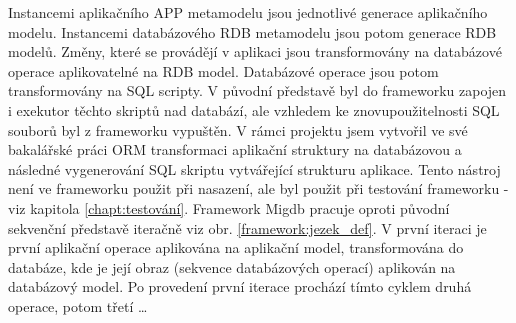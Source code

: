 \documentclass[11pt,twoside,a4paper]{book}
\begin{document}
%
Instancemi aplikačního APP metamodelu jsou jednotlivé generace aplikačního
modelu. Instancemi databázového RDB metamodelu jsou potom generace RDB modelů.
Změny, které se provádějí v aplikaci jsou transformovány na databázové operace
aplikovatelné na RDB model. Databázové operace jsou potom transformovány na SQL
scripty. V původní představě byl do frameworku zapojen i exekutor těchto
skriptů nad databází, ale vzhledem ke znovupoužitelnosti SQL souborů byl z
frameworku vypuštěn.
\FloatBarrier
%
V rámci projektu jsem vytvořil ve své bakalářské práci \cite{Lukes} ORM
transformaci aplikační struktury na databázovou a následné vygenerování SQL
skriptu vytvářející strukturu aplikace. Tento nástroj není ve frameworku použit
při nasazení, ale byl použit při testování frameworku - viz
kapitola \ref{chapt:testování}. Framework Migdb pracuje oproti původní
sekvenční představě iteračně viz obr. \ref{framework:jezek_def}. V první
iteraci je první aplikační operace aplikována na aplikační model, transformována do
databáze, kde je její obraz (sekvence databázových operací) aplikován na
databázový model. Po provedení první iterace prochází tímto cyklem druhá
operace, potom třetí \ldots
%
\end{document}
